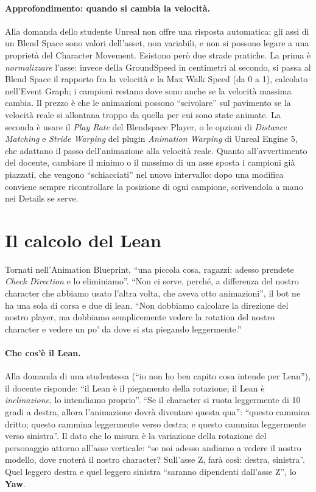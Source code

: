 \paragraph{Approfondimento: quando si cambia la velocità.} Alla domanda dello studente
Unreal non offre una risposta automatica: gli assi di un Blend Space sono valori
dell'asset, non variabili, e non si possono legare a una proprietà del Character
Movement. Esistono però due strade pratiche. La prima è \emph{normalizzare} l'asse: invece
della GroundSpeed in centimetri al secondo, si passa al Blend Space il rapporto fra la
velocità e la Max Walk Speed (da 0 a 1), calcolato nell'Event Graph; i campioni restano
dove sono anche se la velocità massima cambia. Il prezzo è che le animazioni possono
``scivolare'' sul pavimento se la velocità reale si allontana troppo da quella per cui
sono state animate. La seconda è usare il \emph{Play Rate} del Blendspace Player, o le
opzioni di \emph{Distance Matching} e \emph{Stride Warping} del plugin \emph{Animation
Warping} di Unreal Engine 5, che adattano il passo dell'animazione alla velocità reale.
Quanto all'avvertimento del docente, cambiare il minimo o il massimo di un asse sposta i
campioni già piazzati, che vengono ``schiacciati'' nel nuovo intervallo: dopo una modifica
conviene sempre ricontrollare la posizione di ogni campione, scrivendola a mano nei
Details se serve.

\section{Il calcolo del Lean}
\label{ue10:sec:lean}

Tornati nell'Animation Blueprint, ``una piccola cosa, ragazzi: adesso prendete
\emph{Check Direction} e lo eliminiamo''. ``Non ci serve, perché, a differenza del nostro
character che abbiamo usato l'altra volta, che aveva otto animazioni'', il bot ne ha una
sola di corsa e due di lean. ``Non dobbiamo calcolare la direzione del nostro player, ma
dobbiamo semplicemente vedere la rotation del nostro character e vedere un po' da dove si
sta piegando leggermente.''

\paragraph{Che cos'è il Lean.} Alla domanda di una studentessa (``io non ho ben capito cosa
intende per Lean''), il docente risponde: ``il Lean è il piegamento della rotazione; il
Lean è \emph{inclinazione}, lo intendiamo proprio''. ``Se il character si ruota leggermente
di 10 gradi a destra, allora l'animazione dovrà diventare questa qua'': ``questo cammina
dritto; questo cammina leggermente verso destra; e questo cammina leggermente verso
sinistra''. Il dato che lo misura è la variazione della rotazione del personaggio
attorno all'asse verticale: ``se noi adesso andiamo a vedere il nostro modello, dove
ruoterà il nostro character? Sull'asse Z, farà così: destra, sinistra''. Quel leggero
destra e quel leggero sinistra ``saranno dipendenti dall'asse Z'', lo \textbf{Yaw}.

